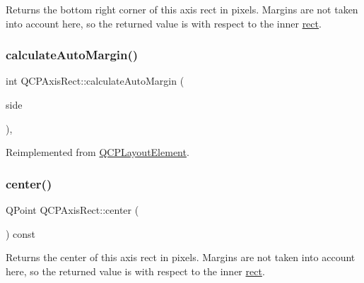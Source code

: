 Returns the bottom right corner of this axis rect in pixels. Margins are not taken into account here, so the returned value is with respect to the inner \mbox{\hyperlink{class_q_c_p_layout_element_a208effccfe2cca4a0eaf9393e60f2dd4}{rect}}. \mbox{\label{class_q_c_p_axis_rect_ac51055d83f5f414b6d013d3a24b0a941}} 
\subsubsection{\texorpdfstring{calculateAutoMargin()}{calculateAutoMargin()}}
{\footnotesize\ttfamily int Q\+C\+P\+Axis\+Rect\+::calculate\+Auto\+Margin (\begin{DoxyParamCaption}\item[{\mbox{\hyperlink{namespace_q_c_p_a7e487e3e2ccb62ab7771065bab7cae54}{Q\+C\+P\+::\+Margin\+Side}}}]{side }\end{DoxyParamCaption})\hspace{0.3cm}{\ttfamily [protected]}, {\ttfamily [virtual]}}



Reimplemented from \mbox{\hyperlink{class_q_c_p_layout_element_a005c9f0fe84bc1591a2cf2c46fd477b4}{Q\+C\+P\+Layout\+Element}}.

\mbox{\label{class_q_c_p_axis_rect_ade3aef874bafcec6dd16174fba44c0b1}} 
\subsubsection{\texorpdfstring{center()}{center()}}
{\footnotesize\ttfamily Q\+Point Q\+C\+P\+Axis\+Rect\+::center (\begin{DoxyParamCaption}{ }\end{DoxyParamCaption}) const\hspace{0.3cm}{\ttfamily [inline]}}

Returns the center of this axis rect in pixels. Margins are not taken into account here, so the returned value is with respect to the inner \mbox{\hyperlink{class_q_c_p_layout_element_a208effccfe2cca4a0eaf9393e60f2dd4}{rect}}. \mbox{\label{class_q_c_p_axis_rect_af710c50530e370539a4439d6c4db9090}} 
